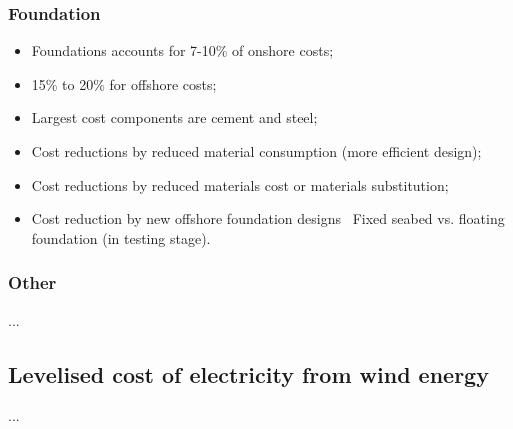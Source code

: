 \documentclass{article}
\newcommand{\tra}{\textrightarrow\ }
\begin{document}
\subsubsection{Foundation}
\begin{itemize}
    \item Foundations accounts for 7-10\% of onshore costs;
    \item 15\% to 20\% for offshore costs;
    \item Largest cost components are cement and steel;
    \item Cost reductions by reduced material consumption (more efficient design);
    \item Cost reductions by reduced materials cost or materials substitution;
    \item Cost reduction by new offshore foundation designs \tra Fixed seabed vs. floating foundation (in testing stage).
\end{itemize}
 
\subsubsection{Other}
...

\subsection{Levelised cost of electricity from wind energy}
...

\newpage
\end{document}
